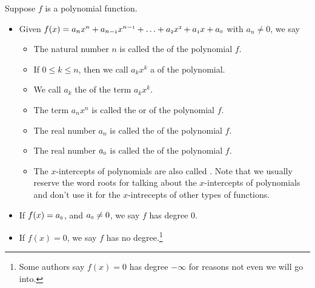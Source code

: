 \documentclass{ximera}
\begin{document}
\begin{definition}

Suppose $f$ is a polynomial function. 
\begin{itemize}
\item Given $f(x) = a_{n} x^{n} + a_{n-\mbox{\tiny$1$}} x^{n-\mbox{\tiny$1$}} + \ldots + a_{\mbox{\tiny $2$}} x^{\mbox{\tiny $2$}} + a_{\mbox{\tiny $1$}} x + a_{\mbox{\tiny $0$}}$ with $a_{n} \neq 0$, we say 

\begin{itemize}

\item  The natural number $n$ is called the  of the polynomial $f$.

\item  If $0 \leq k \leq n$, then we call $a_{k} x^{k}$ a  of the polynomial.  

\item  We call $a_k$ the  of the term $a_{k} x^{k}$. 

\item  The term $a_{n} x^{n}$ is called the  or  of the polynomial $f$.

\item  The real number $a_{n}$ is called the  of the polynomial $f$.

\item  The real number $a_{\mbox{\tiny $0$}}$ is called the  of the polynomial $f$.

\item  The $x$-intercepts of polynomials are also called .  Note that we usually reserve the word roots for talking about the $x$-intercepts of polynomials and don't use it for the $x$-intrecepts of other types of functions.

\end{itemize}

\item  If $f(x) = a_{\mbox{\tiny $0$}}$, and $a_{\mbox{\tiny $0$}} \neq 0$, we say $f$ has degree $0$.

\item  If $f(x) = 0$, we say $f$ has no degree.\footnote{Some authors say $f(x) = 0$ has degree $-\infty$ for reasons not even we will go into.}

\end{itemize}

\end{definition}
\end{document}

